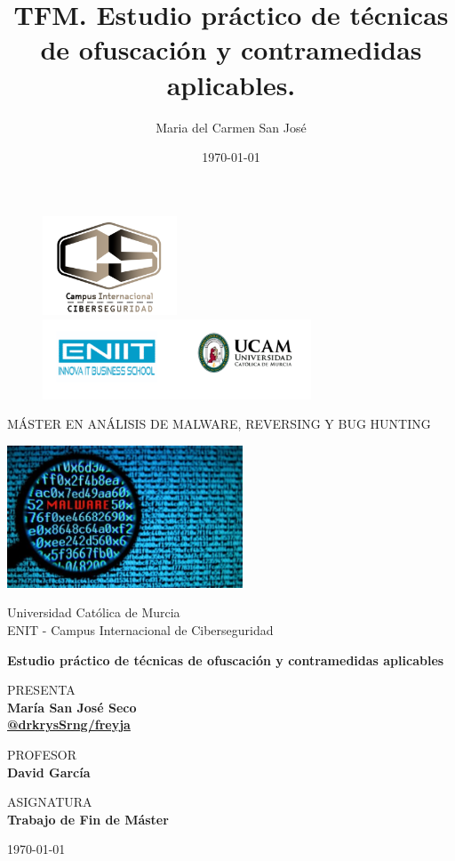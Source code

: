 \documentclass[15pt]{article}
\title{TFM. Estudio práctico de técnicas de ofuscación y contramedidas aplicables.}
\author{Maria del Carmen San José}
\date{\today}
\begin{document}
	
	\thispagestyle{empty}
	
	\begin{figure}[ht]
		\includegraphics[width=4cm]{images/logo.png}
		\endminipage
		\includegraphics[width=8cm]{images/logo_uni.png}
		\endminipage
	\end{figure}
	
	\begin{center}
		\vspace{0.5cm}
		\LARGE
		MÁSTER EN ANÁLISIS DE MALWARE, REVERSING Y BUG HUNTING
		
		\vspace{0.8cm}
		\centering
		\includegraphics[width=7cm]{images/front1.jpeg}
		
		
		\vspace{0.5cm}
		\LARGE
		Universidad Católica de Murcia\\
		ENIT - Campus Internacional de Ciberseguridad
		
		
		\vspace{0.5cm}	
		\Large
		\textbf{Estudio práctico de técnicas de ofuscación y contramedidas aplicables}
		
		\vspace{0.5cm}
		\normalsize	
		PRESENTA \\
		\vspace{.3cm}
		\large
		\textbf{María San José Seco\\ \href{https://github.com/drkrysSrng/freyja}{@drkrysSrng/freyja} }
		
		\vspace{0.5cm}
		\normalsize	
		PROFESOR \\
		\vspace{.2cm}
		\large
		\textbf{David García}
		
		\vspace{0.5cm}
		\normalsize	
		ASIGNATURA \\
		\vspace{.2cm}
		\large
		\textbf{Trabajo de Fin de Máster}
		
		\vspace{0.5cm}
		\today
	\end{center}
	
\end{document}
